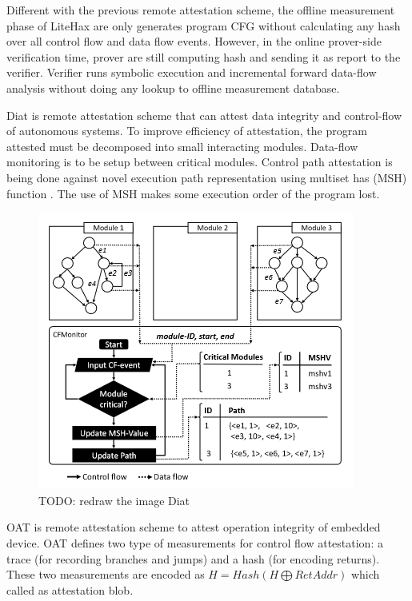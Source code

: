 Different with the previous remote attestation scheme, the offline measurement phase of LiteHax are only generates program CFG without calculating any hash over all control flow and data flow events. However, in the online prover-side verification time, prover are still computing hash and sending it as report to the verifier. Verifier runs symbolic execution and incremental forward data-flow analysis without doing any lookup to offline measurement database.

Diat \cite{aberaDIATDataIntegrity2019} is remote attestation scheme that can attest data integrity and control-flow of autonomous systems. To improve efficiency of attestation, the program attested must be decomposed into small interacting modules. Data-flow monitoring is to be setup between critical modules. Control path attestation is being done against novel execution path representation using multiset has (MSH) function \cite{clarkeIncrementalMultisetHash2003}. The use of MSH makes some execution order of the program lost.

\begin{figure}[htbp]
\centerline{\includegraphics[scale=.5]{Figures/01/diat.png}}
\caption{TODO: redraw the image Diat}
\label{fig:diat}
\end{figure}

OAT \cite{sunOATAttestingOperation2020} is remote attestation scheme to attest operation integrity of embedded device. OAT defines two type of measurements for control flow attestation: a trace (for recording branches and jumps) and a hash (for encoding returns). These two measurements are encoded as $H = Hash(H \bigoplus RetAddr)$ which called as attestation blob.

